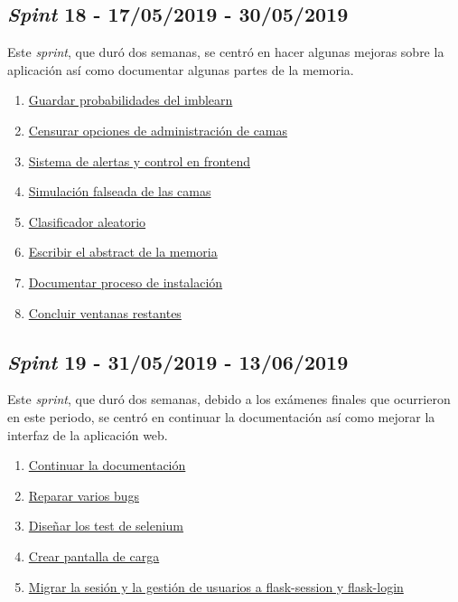\subsection{\textit{Spint} 18 - 17/05/2019 - 30/05/2019}
Este \textit{sprint}, que duró dos semanas, se centró en hacer algunas mejoras sobre la aplicación así como documentar algunas partes de la memoria.

\begin{enumerate}\addtocounter{enumi}{84}
	\item 
	\href{https://github.com/jlgarridol/TFG-SmartBeds/issues/85}{Guardar probabilidades del imblearn}
	\item 
	\href{https://github.com/jlgarridol/TFG-SmartBeds/issues/86}{Censurar opciones de administración de camas}
	\item 
	\href{https://github.com/jlgarridol/TFG-SmartBeds/issues/87}{Sistema de alertas y control en frontend}
	\item 
	\href{https://github.com/jlgarridol/TFG-SmartBeds/issues/88}{Simulación falseada de las camas}
	\item 
	\href{https://github.com/jlgarridol/TFG-SmartBeds/issues/89}{Clasificador aleatorio}
	\item 
	\href{https://github.com/jlgarridol/TFG-SmartBeds/issues/90}{Escribir el abstract de la memoria}
	\item 
	\href{https://github.com/jlgarridol/TFG-SmartBeds/issues/91}{Documentar proceso de instalación}
	\item 
	\href{https://github.com/jlgarridol/TFG-SmartBeds/issues/92}{Concluir ventanas restantes}
\end{enumerate}

\subsection{\textit{Spint} 19 - 31/05/2019 - 13/06/2019}
Este \textit{sprint}, que duró dos semanas, debido a los exámenes finales que ocurrieron en este periodo, se centró en continuar la documentación así como mejorar la interfaz de la aplicación web.

\begin{enumerate}\addtocounter{enumi}{92}
	\item 
	\href{https://github.com/jlgarridol/TFG-SmartBeds/issues/93}{Continuar la documentación}
	\item 
	\href{https://github.com/jlgarridol/TFG-SmartBeds/issues/94}{Reparar varios bugs}
	\item 
	\href{https://github.com/jlgarridol/TFG-SmartBeds/issues/95}{Diseñar los test de selenium}
	\item 
	\href{https://github.com/jlgarridol/TFG-SmartBeds/issues/96}{Crear pantalla de carga}
	\item 
	\href{https://github.com/jlgarridol/TFG-SmartBeds/issues/97}{Migrar la sesión y la gestión de usuarios a flask-session y flask-login}
\end{enumerate}

